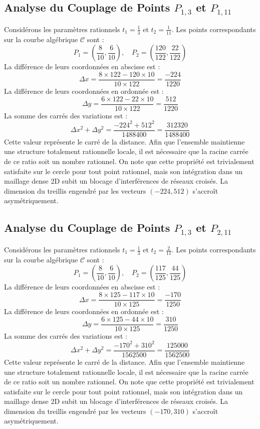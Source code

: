 \documentclass[12pt, a4paper]{article}
\begin{document}
\subsection{Analyse du Couplage de Points $P_{1,3}$ et $P_{1,11}$}
Considérons les paramètres rationnels $t_1 = \frac{1}{3}$ et $t_2 = \frac{1}{11}$.
Les points correspondants sur la courbe algébrique $\mathcal{C}$ sont :
$$ P_1 = \left( \frac{8}{10}, \frac{6}{10} \right), \quad P_2 = \left( \frac{120}{122}, \frac{22}{122} \right) $$
La différence de leurs coordonnées en abscisse est :
$$ \Delta x = \frac{8 \times 122 - 120 \times 10}{10 \times 122} = \frac{-224}{1220} $$
La différence de leurs coordonnées en ordonnée est :
$$ \Delta y = \frac{6 \times 122 - 22 \times 10}{10 \times 122} = \frac{512}{1220} $$
La somme des carrés des variations est :
$$ \Delta x^2 + \Delta y^2 = \frac{ -224^2 + 512^2 }{ 1488400 } = \frac{ 312320 }{ 1488400 } $$
Cette valeur représente le carré de la distance. Afin que l'ensemble maintienne une structure totalement rationnelle locale, il est nécessaire que la racine carrée de ce ratio soit un nombre rationnel. On note que cette propriété est trivialement satisfaite sur le cercle pour tout point rationnel, mais son intégration dans un maillage dense 2D subit un blocage d'interférences de réseaux croisés. La dimension du treillis engendré par les vecteurs $( -224, 512 )$ s'accroît asymétriquement.


\subsection{Analyse du Couplage de Points $P_{1,3}$ et $P_{2,11}$}
Considérons les paramètres rationnels $t_1 = \frac{1}{3}$ et $t_2 = \frac{2}{11}$.
Les points correspondants sur la courbe algébrique $\mathcal{C}$ sont :
$$ P_1 = \left( \frac{8}{10}, \frac{6}{10} \right), \quad P_2 = \left( \frac{117}{125}, \frac{44}{125} \right) $$
La différence de leurs coordonnées en abscisse est :
$$ \Delta x = \frac{8 \times 125 - 117 \times 10}{10 \times 125} = \frac{-170}{1250} $$
La différence de leurs coordonnées en ordonnée est :
$$ \Delta y = \frac{6 \times 125 - 44 \times 10}{10 \times 125} = \frac{310}{1250} $$
La somme des carrés des variations est :
$$ \Delta x^2 + \Delta y^2 = \frac{ -170^2 + 310^2 }{ 1562500 } = \frac{ 125000 }{ 1562500 } $$
Cette valeur représente le carré de la distance. Afin que l'ensemble maintienne une structure totalement rationnelle locale, il est nécessaire que la racine carrée de ce ratio soit un nombre rationnel. On note que cette propriété est trivialement satisfaite sur le cercle pour tout point rationnel, mais son intégration dans un maillage dense 2D subit un blocage d'interférences de réseaux croisés. La dimension du treillis engendré par les vecteurs $( -170, 310 )$ s'accroît asymétriquement.
\end{document}
